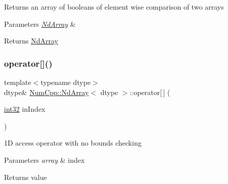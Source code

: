 Returns an array of booleans of element wise comparison of two arrays


\begin{DoxyParams}{Parameters}
{\em \mbox{\hyperlink{class_num_cpp_1_1_nd_array}{Nd\+Array}}} & \\
\hline
\end{DoxyParams}
\begin{DoxyReturn}{Returns}
\mbox{\hyperlink{class_num_cpp_1_1_nd_array}{Nd\+Array}} 
\end{DoxyReturn}
\mbox{\label{class_num_cpp_1_1_nd_array_a71ba3fbd191e766c38ba5533473b08c2}} 
\subsubsection{\texorpdfstring{operator[]()}{operator[]()}\hspace{0.1cm}{\footnotesize\ttfamily [1/3]}}
{\footnotesize\ttfamily template$<$typename dtype$>$ \\
dtype\& \mbox{\hyperlink{class_num_cpp_1_1_nd_array}{Num\+Cpp\+::\+Nd\+Array}}$<$ dtype $>$\+::operator\mbox{[}$\,$\mbox{]} (\begin{DoxyParamCaption}\item[{\mbox{\hyperlink{namespace_num_cpp_acf3eb1592f8b248ff0a236634864633c}{int32}}}]{in\+Index }\end{DoxyParamCaption})\hspace{0.3cm}{\ttfamily [inline]}}

1D access operator with no bounds checking


\begin{DoxyParams}{Parameters}
{\em array} & index \\
\hline
\end{DoxyParams}
\begin{DoxyReturn}{Returns}
value 
\end{DoxyReturn}
\mbox{\label{class_num_cpp_1_1_nd_array_a51d1075cd14c8be1e6ecc9198b41a1c9}} 
